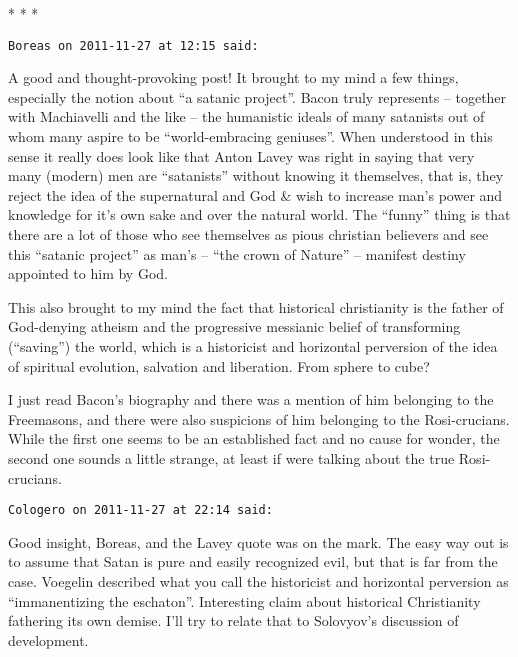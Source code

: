 
\begin{center}* * *\end{center}

\begin{footnotesize}\begin{sffamily}

\texttt{Boreas on 2011-11-27 at 12:15 said: }

A good and thought-provoking post! It brought to my mind a few things, especially the notion about “a satanic project”. Bacon truly represents – together with Machiavelli and the like – the humanistic ideals of many satanists out of whom many aspire to be “world-embracing geniuses”. When understood in this sense it really does look like that Anton Lavey was right in saying that very many (modern) men are “satanists” without knowing it themselves, that is, they reject the idea of the supernatural and God \& wish to increase man's power and knowledge for it's own sake and over the natural world. The “funny” thing is that there are a lot of those who see themselves as pious christian believers and see this “satanic project” as man's – “the crown of Nature” – manifest destiny appointed to him by God.

This also brought to my mind the fact that historical christianity is the father of God-denying atheism and the progressive messianic belief of transforming (“saving”) the world, which is a historicist and horizontal perversion of the idea of spiritual evolution, salvation and liberation. From sphere to cube?

I just read Bacon's biography and there was a mention of him belonging to the Freemasons, and there were also suspicions of him belonging to the Rosi-crucians. While the first one seems to be an established fact and no cause for wonder, the second one sounds a little strange, at least if were talking about the true Rosi-crucians.


\hfill

\texttt{Cologero on 2011-11-27 at 22:14 said: }

Good insight, Boreas, and the Lavey quote was on the mark. The easy way out is to assume that Satan is pure and easily recognized evil, but that is far from the case. Voegelin described what you call the historicist and horizontal perversion as “immanentizing the eschaton”. Interesting claim about historical Christianity fathering its own demise. I'll try to relate that to Solovyov's discussion of development.



\end{sffamily}
\end{footnotesize}

